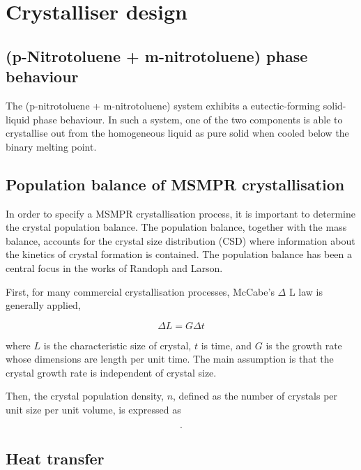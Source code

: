 \section{Crystalliser design}

\subsection{(p-Nitrotoluene + m-nitrotoluene) phase behaviour}

The (p-nitrotoluene + m-nitrotoluene) system exhibits a eutectic-forming solid-liquid phase behaviour. In such a system, one of the two components is able to crystallise out from the homogeneous liquid as pure solid when cooled below the binary melting point. 

\subsection{Population balance of MSMPR crystallisation}
In order to specify a MSMPR crystallisation process, it is important to determine the crystal population balance. The population balance, together with the mass balance, accounts for the crystal size distribution (CSD) where information about the kinetics of crystal formation is contained. The population balance has been a central focus in the works of Randoph and Larson. 

First, for many commercial crystallisation processes, McCabe's $\Delta$ L law is generally applied, 

\begin{equation} \label{eq: McCabe deltaL}
    \Delta L = G \Delta t
\end{equation}

\noindent where $L$ is the characteristic size of crystal, $t$ is time, and $G$ is the growth rate whose dimensions are length per unit time. The main assumption is that the crystal growth rate is independent of crystal size. 

Then, the crystal population density, $n$, defined as the number of crystals per unit size per unit volume, is expressed as 

\begin{equation} \label{eq:crystal population density definition}
    .
\end{equation}






\subsection{Heat transfer}

